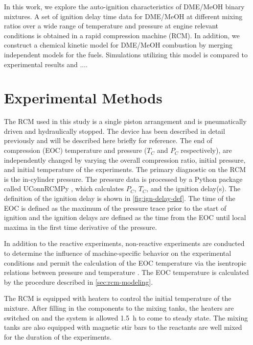 \documentclass[12pt]{../ussci}
\begin{document}
In this work, we explore the auto-ignition characteristics of DME/MeOH binary
mixtures. A set of ignition delay time data for DME/MeOH at different mixing
ratios over a wide range of temperature and pressure at engine relevant
conditions is obtained in a rapid compression machine (RCM). In addition, we
construct a chemical kinetic model for DME/MeOH combustion by merging
independent models for the fuels. Simulations utilizing this model is compared to experimental results and ....

\section{Experimental Methods}\label{sec:experimental-methods}

The RCM used in this study is a single piston arrangement and is pneumatically
driven and hydraulically stopped. The device has been described in detail
previously \autocite{Mittal2007a} and will be described here briefly for
reference. The end of compression (EOC) temperature and pressure (\(T_C\) and
\(P_C\) respectively), are independently changed by varying the overall
compression ratio, initial pressure, and initial temperature of the experiments.
The primary diagnostic on the RCM is the in-cylinder pressure. The pressure data
is processed by a Python package called UConnRCMPy \autocite{uconnrcmpy}, which
calculates \(P_C\), \(T_C\), and the ignition delay(s). The definition of the
ignition delay is shown in \cref{fig:ign-delay-def}. The time of the EOC is
defined as the maximum of the pressure trace prior to the start of ignition and
the ignition delays are defined as the time from the EOC until local maxima in
the first time derivative of the pressure.

In addition to the reactive experiments, non-reactive experiments are conducted
to determine the influence of machine-specific behavior on the experimental
conditions and permit the calculation of the EOC temperature via the isentropic
relations between pressure and temperature \autocite{Lee1998}. The EOC
temperature is calculated by the procedure described in
\cref{sec:rcm-modeling}.

The RCM is equipped with heaters to control the initial temperature of the
mixture. After filling in the components to the mixing tanks, the heaters are
switched on and the system is allowed \SI{1.5}{\hour} to come to steady state.
The mixing tanks are also equipped with magnetic stir bars to the reactants are
well mixed for the duration of the experiments.
\end{document}
